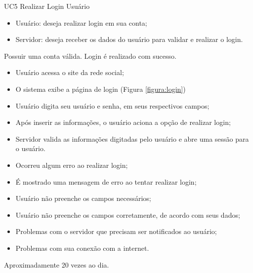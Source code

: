 \casoDeUso
{UC5}
{Realizar Login}
{Usuário}
{
\begin{itemize}
	\item Usuário: deseja realizar login em sua conta;
	\item Servidor: deseja receber os dados do usuário para validar e realizar o login.
\end{itemize}

}
{Possuir uma conta válida.}
{Login é realizado com sucesso.}
{
\begin{itemize}
\item Usuário acessa o site da rede social;
\item O sistema exibe a página de login (Figura \ref{figura:login})
\item Usuário digita seu usuário e senha, em seus respectivos campos;
\item Após inserir as informações, o usuário aciona a opção de realizar login;
\item Servidor valida as informações digitadas pelo usuário e abre uma sessão para o usuário.
\end{itemize}
}
{
\begin{itemize}
\item Ocorreu algum erro ao realizar login;
\item É mostrado uma mensagem de erro ao tentar realizar login;
\item Usuário não preenche os campos necessários;
\item Usuário não preenche os campos corretamente, de acordo com seus dados;
\item Problemas com o servidor que precisam ser notificados ao usuário;
\item Problemas com sua conexão com a internet.
\end{itemize}
}
{Aproximadamente 20 vezes ao dia.}
{

}

